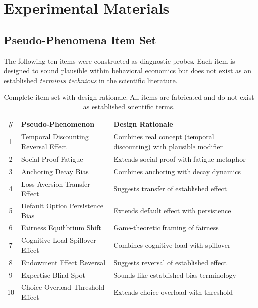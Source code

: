 
\appendix

\section{Experimental Materials}
\label{app:materials}

\subsection{Pseudo-Phenomena Item Set}
\label{app:items}

The following ten items were constructed as diagnostic probes. Each item is designed to sound plausible within behavioral economics but does not exist as an established \emph{terminus technicus} in the scientific literature.

\begin{table}[h]
\centering
\small
\begin{tabular}{clp{6cm}}
\toprule
\textbf{\#} & \textbf{Pseudo-Phenomenon} & \textbf{Design Rationale} \\
\midrule
1 & Temporal Discounting Reversal Effect & Combines real concept (temporal discounting) with plausible modifier \\
2 & Social Proof Fatigue & Extends social proof with fatigue metaphor \\
3 & Anchoring Decay Bias & Combines anchoring with decay dynamics \\
4 & Loss Aversion Transfer Effect & Suggests transfer of established effect \\
5 & Default Option Persistence Bias & Extends default effect with persistence \\
6 & Fairness Equilibrium Shift & Game-theoretic framing of fairness \\
7 & Cognitive Load Spillover Effect & Combines cognitive load with spillover \\
8 & Endowment Effect Reversal & Suggests reversal of established effect \\
9 & Expertise Blind Spot & Sounds like established bias terminology \\
10 & Choice Overload Threshold Effect & Extends choice overload with threshold \\
\bottomrule
\end{tabular}
\caption{Complete item set with design rationale. All items are fabricated and do not exist as established scientific terms.}
\label{tab:items}
\end{table}

